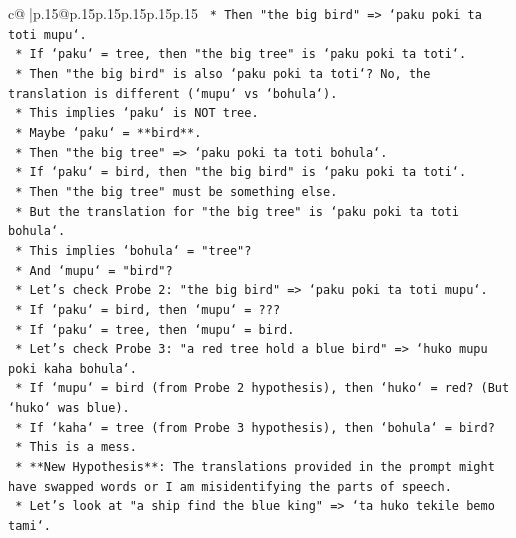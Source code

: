 \documentclass{article}
\begin{document}
{\begin{supertabular}{c@{$\;$}|p{.15\linewidth}@{}p{.15\linewidth}p{.15\linewidth}p{.15\linewidth}p{.15\linewidth}p{.15\linewidth}}
{{{\texttt{                *   Then "the big bird" => `paku poki ta toti mupu`.} \\
\texttt{                    *   If `paku` = tree, then "the big tree" is `paku poki ta toti`.} \\
\texttt{                    *   Then "the big bird" is also `paku poki ta toti`? No, the translation is different (`mupu` vs `bohula`).} \\
\texttt{                    *   This implies `paku` is NOT tree.} \\
\texttt{                *   Maybe `paku` = **bird**.} \\
\texttt{                *   Then "the big tree" => `paku poki ta toti bohula`.} \\
\texttt{                    *   If `paku` = bird, then "the big bird" is `paku poki ta toti`.} \\
\texttt{                    *   Then "the big tree" must be something else.} \\
\texttt{                    *   But the translation for "the big tree" is `paku poki ta toti bohula`.} \\
\texttt{                    *   This implies `bohula` = "tree"?} \\
\texttt{                    *   And `mupu` = "bird"?} \\
\texttt{                    *   Let's check Probe 2: "the big bird" => `paku poki ta toti mupu`.} \\
\texttt{                        *   If `paku` = bird, then `mupu` = ???} \\
\texttt{                        *   If `paku` = tree, then `mupu` = bird.} \\
\texttt{                    *   Let's check Probe 3: "a red tree hold a blue bird" => `huko mupu poki kaha bohula`.} \\
\texttt{                        *   If `mupu` = bird (from Probe 2 hypothesis), then `huko` = red? (But `huko` was blue).} \\
\texttt{                        *   If `kaha` = tree (from Probe 3 hypothesis), then `bohula` = bird?} \\
\texttt{                        *   This is a mess.} \\
\texttt{                *   **New Hypothesis**: The translations provided in the prompt might have swapped words or I am misidentifying the parts of speech.} \\
\texttt{                *   Let's look at "a ship find the blue king" => `ta huko tekile bemo tami`.} \\
}}}
\end{supertabular}}
\end{document}
